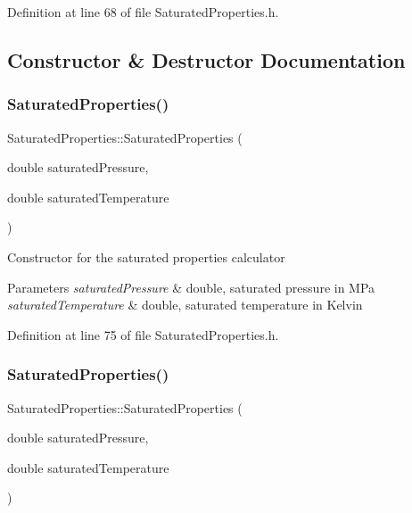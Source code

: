Definition at line 68 of file Saturated\+Properties.\+h.



\subsection{Constructor \& Destructor Documentation}
\mbox{\label{class_saturated_properties_a83cc16d024ff9bd7ac586df9e946a062}} 
\subsubsection{\texorpdfstring{Saturated\+Properties()}{SaturatedProperties()}\hspace{0.1cm}{\footnotesize\ttfamily [1/3]}}
{\footnotesize\ttfamily Saturated\+Properties\+::\+Saturated\+Properties (\begin{DoxyParamCaption}\item[{double}]{saturated\+Pressure,  }\item[{double}]{saturated\+Temperature }\end{DoxyParamCaption})\hspace{0.3cm}{\ttfamily [inline]}}

Constructor for the saturated properties calculator 
\begin{DoxyParams}{Parameters}
{\em saturated\+Pressure} & double, saturated pressure in M\+Pa \\
\hline
{\em saturated\+Temperature} & double, saturated temperature in Kelvin \\
\hline
\end{DoxyParams}


Definition at line 75 of file Saturated\+Properties.\+h.

\mbox{\label{class_saturated_properties_a83cc16d024ff9bd7ac586df9e946a062}} 
\subsubsection{\texorpdfstring{Saturated\+Properties()}{SaturatedProperties()}\hspace{0.1cm}{\footnotesize\ttfamily [2/3]}}
{\footnotesize\ttfamily Saturated\+Properties\+::\+Saturated\+Properties (\begin{DoxyParamCaption}\item[{double}]{saturated\+Pressure,  }\item[{double}]{saturated\+Temperature }\end{DoxyParamCaption})\hspace{0.3cm}{\ttfamily [inline]}}

